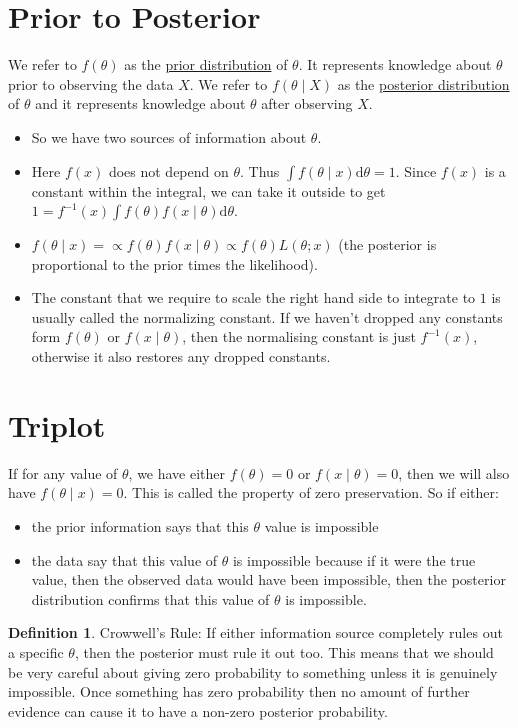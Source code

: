 \documentclass[lecture,12pt,]{pcms-l}
\numberwithin{section}{chapter}
\numberwithin{equation}{chapter}
\theoremstyle{plain}
\theoremstyle{definition}
\theoremstyle{definition}
\newtheorem{definition}[equation]{Definition}
\begin{document}
\section{Prior to Posterior}
We refer to $f(\theta)$ as the \underline{prior distribution} of $\theta$. It represents knowledge about $\theta$ prior to observing the data $X$. We refer to $f(\theta \mid X)$ as the \underline{posterior distribution} of $\theta$ and it represents knowledge about $\theta$ after observing $X$. 
\begin{itemize}
\item So we have two sources of information about $\theta$.
\item Here $f(x)$ does not depend on $\theta$. Thus $\int f(\theta \mid x) \mathrm{d} \theta=1$. Since $f(x)$ is a constant within the integral, we can take it outside to get $1=f^{-1}(x)\int f(\theta) f(x \mid \theta) \mathrm{d}\theta$.
\item $f(\theta \mid x)= \propto f(\theta) f(x \mid \theta)\propto f(\theta) L(\theta ; x)$ (the posterior is proportional to the prior times the likelihood).
\item The constant that we require to scale the right hand side to integrate to $1$ is usually called the normalizing constant. If we haven't dropped any constants form $f(\theta)$ or $f(x \mid \theta)$, then the normalising constant is just $f^{-1}(x)$, otherwise it also restores any dropped constants. 
\end{itemize}
\section{Triplot}
If for any value of $\theta$, we have either $f(\theta)=0$ or $f(x\mid \theta)=0$, then we will also have $f(\theta \mid x)=0$. This is called the property of zero preservation. So if either:
\begin{itemize}
\item the prior information says that this $\theta$ value is impossible
\item the data say that this value of $\theta$ is impossible because if it were the true value, then the observed data would have been impossible, then the posterior distribution confirms that this value of $\theta$ is impossible.
\end{itemize}

\begin{definition}{Crowwell's Rule:}
If either information source completely rules out a specific $\theta$, then the posterior must rule it out too. This means that we should be very careful about giving zero probability to something unless it is genuinely impossible. Once something has zero probability then no amount of further evidence can cause it to have a non-zero posterior probability.
\end{definition}
\end{document}

